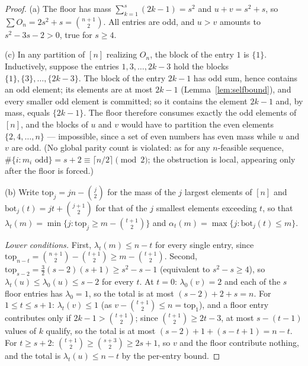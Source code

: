 \documentclass[11pt]{article}
\theoremstyle{definition}
\theoremstyle{remark}
\newcommand{\intv}[1]{[#1]}
\begin{document}
\begin{proof}
(a) The floor has mass $\sum_{k=1}^{s}(2k-1)=s^2$ and $u+v=s^2+s$, so
$\sum O_n=2s^2+s=\binom{n+1}{2}$. All entries are odd, and $u>v$ amounts to
$s^2-3s-2>0$, true for $s\ge4$.

(c) In any partition of $\intv n$ realizing $O_n$, the block of the entry $1$ is
$\{1\}$. Inductively, suppose the entries $1,3,\dots,2k-3$ hold the blocks
$\{1\},\{3\},\dots,\{2k-3\}$. The block of the entry $2k-1$ has odd sum, hence
contains an odd element; its elements are at most $2k-1$ (Lemma~\ref{lem:selfbound}),
and every smaller odd element is committed; so it contains the element $2k-1$ and,
by mass, equals $\{2k-1\}$. The floor therefore consumes exactly the odd elements of
$\intv n$, and the blocks of $u$ and $v$ would have to partition the even elements
$\{2,4,\dots,n\}$ --- impossible, since a set of even numbers has even mass while $u$
and $v$ are odd. (No global parity count is violated: as for any $n$-feasible
sequence, $\#\{i:m_i\text{ odd}\}=s+2\equiv\lceil n/2\rceil\pmod 2$; the obstruction
is local, appearing only after the floor is forced.)

(b) Write $\mathrm{top}_j=jn-\binom{j}{2}$ for the mass of the $j$ largest elements
of $\intv n$ and $\mathrm{bot}_j(t)=jt+\binom{j+1}{2}$ for that of the $j$ smallest
elements exceeding $t$, so that $\lambda_t(m)=\min\{j:\mathrm{top}_j\ge
m-\binom{t+1}{2}\}$ and $\alpha_t(m)=\max\{j:\mathrm{bot}_j(t)\le m\}$.

\emph{Lower conditions.} First, $\lambda_t(m)\le n-t$ for every single entry, since
$\mathrm{top}_{n-t}=\binom{n+1}{2}-\binom{t+1}{2}\ge m-\binom{t+1}{2}$. Second,
$\mathrm{top}_{s-2}=\tfrac32(s-2)(s+1)\ge s^2-s-1$ (equivalent to $s^2-s\ge4$), so
$\lambda_t(u)\le\lambda_0(u)\le s-2$ for every $t$. At $t=0$: $\lambda_0(v)=2$ and
each of the $s$ floor entries has $\lambda_0=1$, so the total is at most
$(s-2)+2+s=n$. For $1\le t\le s+1$: $\lambda_t(v)\le1$ (as
$v-\binom{t+1}{2}\le n=\mathrm{top}_1$), and a floor entry contributes only if
$2k-1>\binom{t+1}{2}$; since $\binom{t+1}{2}\ge2t-3$, at most $s-(t-1)$ values of
$k$ qualify, so the total is at most $(s-2)+1+(s-t+1)=n-t$. For $t\ge s+2$:
$\binom{t+1}{2}\ge\binom{s+3}{2}\ge2s+1$, so $v$ and the floor contribute nothing,
and the total is $\lambda_t(u)\le n-t$ by the per-entry bound.


\end{proof}
\end{document}

